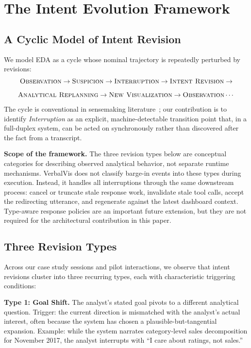 \documentclass[journal]{IEEEtran}
\begin{document}
\section{The Intent Evolution Framework}
\label{sec:framework}

\subsection{A Cyclic Model of Intent Revision}
We model EDA as a cycle whose nominal trajectory is repeatedly perturbed by revisions:
\[
\textsc{Observation} \rightarrow \textsc{Suspicion} \rightarrow \textsc{Interruption} \rightarrow \textsc{Intent Revision} \rightarrow
\]
\[
\textsc{Analytical Replanning} \rightarrow \textsc{New Visualization} \rightarrow \textsc{Observation} \cdots
\]
The cycle is conventional in sensemaking literature~\cite{pirolli2005sensemaking}; our contribution is to identify \emph{Interruption} as an explicit, machine-detectable transition point that, in a full-duplex system, can be acted on synchronously rather than discovered after the fact from a transcript.

\noindent\textbf{Scope of the framework.}
The three revision types below are conceptual categories for describing observed analytical behavior, not separate runtime mechanisms. VerbalVis does not classify barge-in events into these types during execution. Instead, it handles all interruptions through the same downstream process: cancel or truncate stale response work, invalidate stale tool calls, accept the redirecting utterance, and regenerate against the latest dashboard context. Type-aware response policies are an important future extension, but they are not required for the architectural contribution in this paper.

\subsection{Three Revision Types}
Across our case study sessions and pilot interactions, we observe that intent revisions cluster into three recurring types, each with characteristic triggering conditions:

\textbf{Type 1: Goal Shift.} The analyst's stated goal pivots to a different analytical question. Trigger: the current direction is mismatched with the analyst's actual interest, often because the system has chosen a plausible-but-tangential expansion. Example: while the system narrates category-level sales decomposition for November 2017, the analyst interrupts with ``I care about ratings, not sales.''
\end{document}
